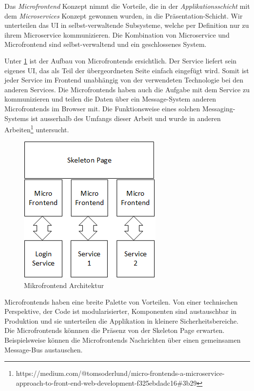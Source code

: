 Das  \textit{Microfrontend} Konzept nimmt die Vorteile, die in der \textit{Applikationsschicht} mit dem \textit{Microservices} Konzept gewonnen wurden, in die Präsentation-Schicht. Wir unterteilen das \ac{UI} in selbst-verwaltende Subsysteme, welche per Definition nur  zu ihrem Microservice kommunizieren. Die Kombination von Microservice und Microfrontend sind selbst-verwaltend und ein geschlossenes System.

Unter \ref{fig:requirements:introduction:microfrontend} ist der Aufbau von Microfrontends ersichtlich. Der Service liefert sein eigenes UI, das als Teil der übergeordneten Seite einfach eingefügt wird. Somit ist jeder Service im Frontend unabhängig von der verwendeten Technologie bei den anderen Services. Die Microfrontends haben auch die Aufgabe mit dem Service zu kommunizieren und teilen die Daten über ein Message-System anderen Microfrontends im Browser mit. Die Funktionsweise eines solchen Messaging-Systems ist ausserhalb des Umfangs dieser Arbeit und wurde in anderen Arbeiten\footnote{https://medium.com/@tomsoderlund/micro-frontends-a-microservice-approach-to-front-end-web-development-f325ebdadc16\#3b29} untersucht.

\begin{figure}
    \centering
    \includegraphics{./sections/requirements/assets/MicroFrontendArchitecture}
    \caption{Mikrofrontend Architektur}
    \label{fig:requirements:introduction:microfrontend}
\end{figure}

Microfrontends  haben eine breite Palette von Vorteilen. Von einer technischen Perspektive, der Code ist modularisierter, Komponenten sind austauschbar in Produktion und sie unterteilen die Applikation in kleinere Sicherheitsbereiche. Die Microfrontends könnnen die Präsenz von der Skeleton Page erwarten. Beispielsweise können die Microfrontends Nachrichten über einen gemeinsamen Message-Bus\cite{Curry2005} austauschen.\cite{Söderlund2017} 

